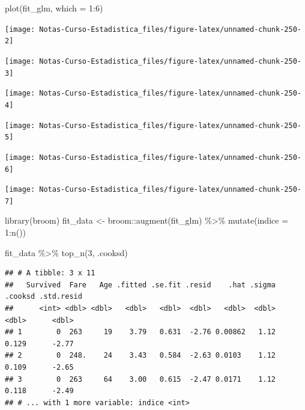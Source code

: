 \documentclass[
  12pt,
]{book}
\newenvironment{Shaded}{\begin{snugshade}}{\end{snugshade}}
\newcommand{\AttributeTok}[1]{\textcolor[rgb]{0.77,0.63,0.00}{#1}}
\newcommand{\DecValTok}[1]{\textcolor[rgb]{0.00,0.00,0.81}{#1}}
\newcommand{\FunctionTok}[1]{\textcolor[rgb]{0.00,0.00,0.00}{#1}}
\newcommand{\NormalTok}[1]{#1}
\newcommand{\OtherTok}[1]{\textcolor[rgb]{0.56,0.35,0.01}{#1}}
\newcommand{\SpecialCharTok}[1]{\textcolor[rgb]{0.00,0.00,0.00}{#1}}
\theoremstyle{definition}
\theoremstyle{definition}
\theoremstyle{definition}
\theoremstyle{remark}
\begin{document}
\begin{Shaded}
\begin{Highlighting}[]
\FunctionTok{plot}\NormalTok{(fit\_glm, }\AttributeTok{which =} \DecValTok{1}\SpecialCharTok{:}\DecValTok{6}\NormalTok{)}
\end{Highlighting}
\end{Shaded}

\begin{center}\texttt{[image: Notas-Curso-Estadistica\_files/figure-latex/unnamed-chunk-250-2]} \end{center}

\begin{center}\texttt{[image: Notas-Curso-Estadistica\_files/figure-latex/unnamed-chunk-250-3]} \end{center}

\begin{center}\texttt{[image: Notas-Curso-Estadistica\_files/figure-latex/unnamed-chunk-250-4]} \end{center}

\begin{center}\texttt{[image: Notas-Curso-Estadistica\_files/figure-latex/unnamed-chunk-250-5]} \end{center}

\begin{center}\texttt{[image: Notas-Curso-Estadistica\_files/figure-latex/unnamed-chunk-250-6]} \end{center}

\begin{center}\texttt{[image: Notas-Curso-Estadistica\_files/figure-latex/unnamed-chunk-250-7]} \end{center}

\begin{Shaded}
\begin{Highlighting}[]
\FunctionTok{library}\NormalTok{(broom)}
\NormalTok{fit\_data }\OtherTok{\textless{}{-}}\NormalTok{ broom}\SpecialCharTok{::}\FunctionTok{augment}\NormalTok{(fit\_glm) }\SpecialCharTok{\%\textgreater{}\%} \FunctionTok{mutate}\NormalTok{(}\AttributeTok{indice =} \DecValTok{1}\SpecialCharTok{:}\FunctionTok{n}\NormalTok{())}

\NormalTok{fit\_data }\SpecialCharTok{\%\textgreater{}\%} \FunctionTok{top\_n}\NormalTok{(}\DecValTok{3}\NormalTok{, .cooksd)}
\end{Highlighting}
\end{Shaded}

\begin{verbatim}
## # A tibble: 3 x 11
##   Survived  Fare   Age .fitted .se.fit .resid    .hat .sigma .cooksd .std.resid
##      <int> <dbl> <dbl>   <dbl>   <dbl>  <dbl>   <dbl>  <dbl>   <dbl>      <dbl>
## 1        0  263     19    3.79   0.631  -2.76 0.00862   1.12   0.129      -2.77
## 2        0  248.    24    3.43   0.584  -2.63 0.0103    1.12   0.109      -2.65
## 3        0  263     64    3.00   0.615  -2.47 0.0171    1.12   0.118      -2.49
## # ... with 1 more variable: indice <int>
\end{verbatim}
\end{document}
